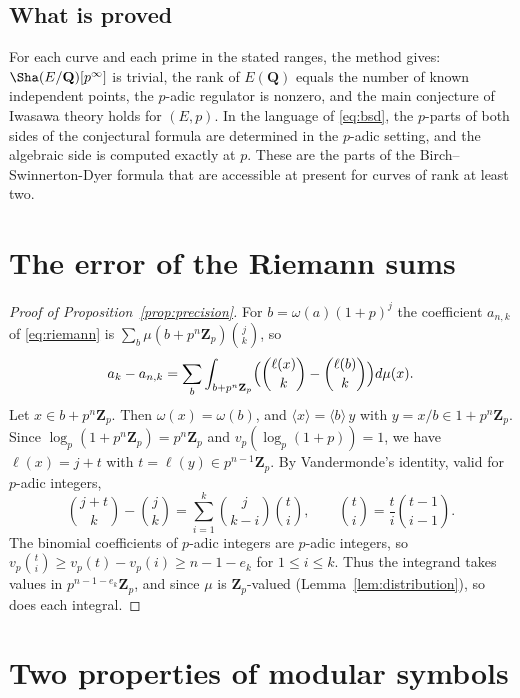 \documentclass[11pt]{amsart}
\theoremstyle{definition}
\newcommand{\Q}{\mathbf{Q}}
\newcommand{\Zp}{\mathbf{Z}_p}
\begin{document}
\subsection{What is proved}
For each curve and each prime in the stated ranges, the method gives: $\Sha(E/\Q)[p^\infty]$ is trivial, the rank of $E(\Q)$ equals the number of known independent points, the $p$-adic regulator is nonzero, and the main conjecture of Iwasawa theory holds for $(E,p)$. In the language of \eqref{eq:bsd}, the $p$-parts of both sides of the conjectural formula are determined in the $p$-adic setting, and the algebraic side is computed exactly at $p$. These are the parts of the Birch--Swinnerton-Dyer formula that are accessible at present for curves of rank at least two.

\appendix

\section{The error of the Riemann sums}\label{app:precision}

\begin{proof}[Proof of Proposition~\ref{prop:precision}]
For $b=\omega(a)(1+p)^j$ the coefficient $a_{n,k}$ of \eqref{eq:riemann} is $\sum_b\mu(b+p^n\Zp)\binom{j}{k}$, so
\[
a_k-a_{n,k}=\sum_b\int_{b+p^n\Zp}\Bigl(\binom{\ell(x)}{k}-\binom{\ell(b)}{k}\Bigr)d\mu(x).
\]
Let $x\in b+p^n\Zp$. Then $\omega(x)=\omega(b)$, and $\langle x\rangle=\langle b\rangle\,y$ with $y=x/b\in1+p^n\Zp$. Since $\log_p(1+p^n\Zp)=p^n\Zp$ and $v_p(\log_p(1+p))=1$, we have $\ell(x)=j+t$ with $t=\ell(y)\in p^{n-1}\Zp$. By Vandermonde's identity, valid for $p$-adic integers,
\[
\binom{j+t}{k}-\binom{j}{k}=\sum_{i=1}^{k}\binom{j}{k-i}\binom{t}{i},\qquad\binom{t}{i}=\frac{t}{i}\binom{t-1}{i-1}.
\]
The binomial coefficients of $p$-adic integers are $p$-adic integers, so $v_p\binom{t}{i}\ge v_p(t)-v_p(i)\ge n-1-e_k$ for $1\le i\le k$. Thus the integrand takes values in $p^{n-1-e_k}\Zp$, and since $\mu$ is $\Zp$-valued (Lemma~\ref{lem:distribution}), so does each integral.
\end{proof}

\section{Two properties of modular symbols}\label{app:hecke}
\end{document}
